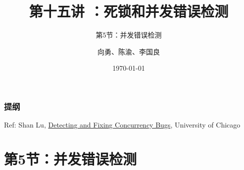 


\title[第15讲]{第十五讲 ：死锁和并发错误检测} %
\subtitle{第5节：并发错误检测}
\author{向勇、陈渝、李国良} %
\date{\today} %



\begin{frame}
\titlepage %
\end{frame}

\begin{frame}
\frametitle{提纲} %
\tableofcontents %

Ref: Shan Lu, \href{https://s4plus.ustc.edu.cn/_upload/article/files/84/48/964812c049829f4538793b862187/430bcb14-7aa7-4689-b340-9c81e735e5eb.pdf}{Detecting and Fixing Concurrency Bugs}, University of Chicago

\end{frame}
\section{第5节：并发错误检测} %
